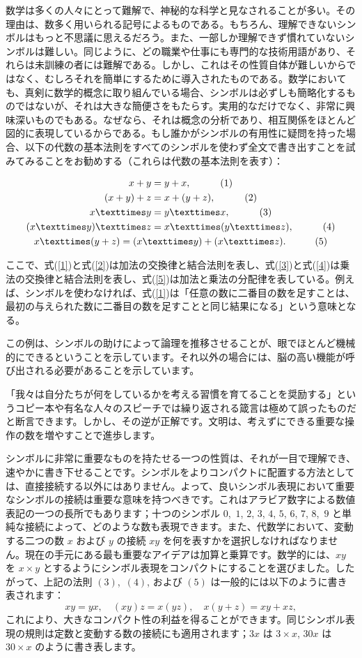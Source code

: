 \documentclass[a4paper,11pt,openany]{ltjsbook}
\providecommand{\Eq}[1]{\ensuremath{#1}}
\providecommand{\Tag}[1]{\tag*{\quad\ensuremath{#1}}}
\begin{document}
数学は多くの人々にとって難解で、神秘的な科学と見なされることが多い。その理由は、数多く用いられる記号によるものである。もちろん、理解できないシンボルはもっと不思議に思えるだろう。また、一部しか理解できず慣れていないシンボルは難しい。同じように、どの職業や仕事にも専門的な技術用語があり、それらは未訓練の者には難解である。しかし、これはその性質自体が難しいからではなく、むしろそれを簡単にするために導入されたものである。数学においても、真剣に数学的概念に取り組んでいる場合、シンボルは必ずしも簡略化するものではないが、それは大きな簡便さをもたらす。実用的なだけでなく、非常に興味深いものでもある。なぜなら、それは概念の分析であり、相互関係をほとんど図的に表現しているからである。もし誰かがシンボルの有用性に疑問を持った場合、以下の代数の基本法則をすべてのシンボルを使わず全文で書き出すことを試みてみることをお勧めする（これらは代数の基本法則を表す）：

\begin{gather*}
x + y = y + x, \Tag{(1)} \\
(x + y) + z = x + (y + z), \Tag{(2)} \\
x × y = y × x, \Tag{(3)} \\
(x × y) × z = x × (y × z), \Tag{(4)} \\
x × (y + z) = (x × y) + (x × z). \Tag{(5)}
\end{gather*}

ここで、式(\ref{1})と式(\ref{2})は加法の交換律と結合法則を表し、式(\ref{3})と式(\ref{4})は乗法の交換律と結合法則を表し、式(\ref{5})は加法と乗法の分配律を表している。例えば、シンボルを使わなければ、式(\ref{1})は「任意の数に二番目の数を足すことは、最初の与えられた数に二番目の数を足すことと同じ結果になる」という意味となる。

この例は、シンボルの助けによって論理を推移させることが、眼でほとんど機械的にできるということを示しています。それ以外の場合には、脳の高い機能が呼び出される必要があることを示しています。

「我々は自分たちが何をしているかを考える習慣を育てることを奨励する」というコピー本や有名な人々のスピーチでは繰り返される箴言は極めて誤ったものだと断言できます。しかし、その逆が正解です。文明は、考えずにできる重要な操作の数を増やすことで進歩します。

シンボルに非常に重要なものを持たせる一つの性質は、それが一目で理解でき、速やかに書き下せることです。シンボルをよりコンパクトに配置する方法としては、直接接続する以外にはありません。よって、良いシンボル表現において重要なシンボルの接続は重要な意味を持つべきです。これはアラビア数字による数値表記の一つの長所でもあります；十つのシンボル $0$,~$1$, $2$, $3$, $4$, $5$, $6$, $7$, $8$,~$9$ と単純な接続によって、どのような数も表現できます。また、代数学において、変動する二つの数 $x$ および $y$ の接続 $xy$ を何を表すかを選択しなければなりません。現在の手元にある最も重要なアイデアは加算と乗算です。数学的には、$xy$ を $x × y$ とするようにシンボル表現をコンパクトにすることを選びました。したがって、上記の法則 \Eq{(3)},~\Eq{(4)}, および \Eq{(5)} は一般的には以下のように書き表されます：
\[
xy = yx,\quad
(xy)z = x(yz),\quad
x(y + z) = xy + xz,
\]
これにより、大きなコンパクト性の利益を得ることができます。同じシンボル表現の規則は定数と変動する数の接続にも適用されます；$3x$ は $3 × x$, $30x$ は $30 × x$ のように書き表します。
\end{document}

